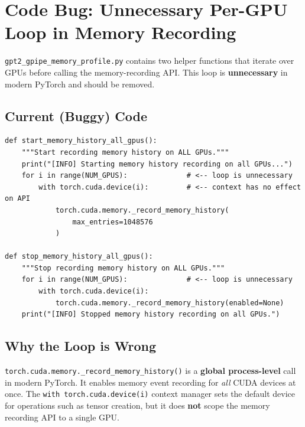 \documentclass[11pt,a4paper]{article}
\begin{document}
\section{Code Bug: Unnecessary Per-GPU Loop in Memory Recording}
\label{sec:bug}

\begin{bugbox}
\texttt{gpt2\_gpipe\_memory\_profile.py} contains two helper functions that
iterate over GPUs before calling the memory-recording API.  This loop is
\textbf{unnecessary} in modern PyTorch and should be removed.
\end{bugbox}

\subsection{Current (Buggy) Code}

\begin{lstlisting}[caption={Current implementation in
  \texttt{gpt2\_gpipe\_memory\_profile.py} (lines 248--266).}]
def start_memory_history_all_gpus():
    """Start recording memory history on ALL GPUs."""
    print("[INFO] Starting memory history recording on all GPUs...")
    for i in range(NUM_GPUS):              # <-- loop is unnecessary
        with torch.cuda.device(i):         # <-- context has no effect on API
            torch.cuda.memory._record_memory_history(
                max_entries=1048576
            )

def stop_memory_history_all_gpus():
    """Stop recording memory history on ALL GPUs."""
    for i in range(NUM_GPUS):              # <-- loop is unnecessary
        with torch.cuda.device(i):
            torch.cuda.memory._record_memory_history(enabled=None)
    print("[INFO] Stopped memory history recording on all GPUs.")
\end{lstlisting}

\subsection{Why the Loop is Wrong}

\texttt{torch.cuda.memory.\_record\_memory\_history()} is a \textbf{global
process-level} call in modern PyTorch.  It enables memory event recording
for \emph{all} CUDA devices at once.  The \texttt{with torch.cuda.device(i)}
context manager sets the default device for operations such as tensor
creation, but it does \textbf{not} scope the memory recording API to a
single GPU.
\end{document}

